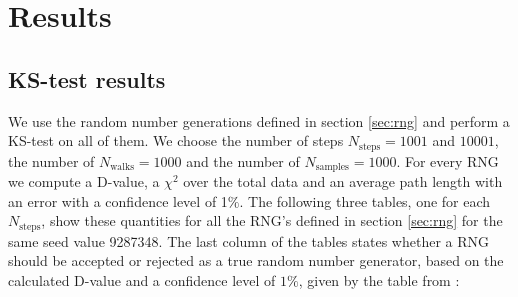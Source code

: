 \documentclass[10pt,a4paper]{article}
\begin{document}
\section{Results}
\subsection{KS-test results}
We use the random number generations defined in section \ref{sec:rng} and perform a KS-test on all of them. We choose the number of steps $N_{\text{steps}} = 1001$ and $10001$, the number of $N_{\text{walks}} = 1000$ and the number of $N_{\text{samples}} = 1000$. For every RNG we compute a D-value, a $\chi^2$ over the total data and an average path length with an error with a confidence level of 1$\%$. The following three tables, one for each $N_{\text{steps}}$, show these quantities for all the RNG's defined in section \ref{sec:rng} for the same seed value 9287348. The last column of the tables states whether a RNG should be accepted or rejected as a true random number generator, based on the calculated D-value and a confidence level of $1\%$, given by the table from \cite{table}:
\end{document}
